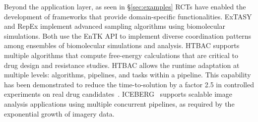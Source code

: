\documentclass[preprint,12pt, a4paper]{elsarticle}
\begin{document}



Beyond the application layer, as seen in
\S\ref{sec:examples} RCTs have enabled
the development of frameworks that provide domain-specific functionalities.
ExTASY and RepEx implement advanced sampling algorithms using biomolecular
simulations. Both use the EnTK API to implement diverse coordination patterns
among ensembles of biomolecular simulations and analysis. HTBAC supports
multiple algorithms that compute free-energy calculations that are critical to
drug design and resistance studies. HTBAC allows the runtime adaptation at
multiple levels: algorithms, pipelines, and tasks within a pipeline. This
capability has been demonstrated to reduce the time-to-solution by a factor 2.5
in controlled experiments on real drug candidates~\citep{dakka2018concurrent}.
ICEBERG~\cite{paraskevakos2019workflow} supports scalable image analysis
applications using multiple concurrent pipelines, as required by the exponential
growth of imagery data.
\end{document}
